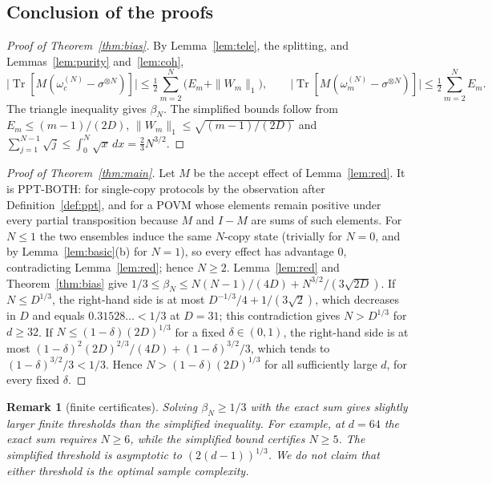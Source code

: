 \documentclass[pdflatex,sn-mathphys-num]{sn-jnl}%
\theoremstyle{thmstyleone}
\theoremstyle{thmstylethree}
\theoremstyle{thmstyletwo}
\newtheorem{remark}[theorem]{Remark}
\newcommand{\Tr}{\operatorname{Tr}}
\begin{document}
\subsection{Conclusion of the proofs}\label{sec:concl}

\begin{proof}[Proof of Theorem~\ref{thm:bias}]
By Lemma~\ref{lem:tele}, the splitting, and Lemmas~\ref{lem:purity} and~\ref{lem:coh},
\[
\bigl|\Tr[M(\omega_c^{(N)}-\sigma^{\otimes N})]\bigr|\le\tfrac12\sum_{m=2}^N\bigl(E_m+\|W_m\|_1\bigr),\qquad
\bigl|\Tr[M(\omega_m^{(N)}-\sigma^{\otimes N})]\bigr|\le\tfrac12\sum_{m=2}^NE_m .
\]
The triangle inequality gives $\beta_N$. The simplified bounds follow from $E_m\le(m-1)/(2D)$,
$\|W_m\|_1\le\sqrt{(m-1)/(2D)}$ and $\sum_{j=1}^{N-1}\sqrt j\le\int_0^N\sqrt x\,dx=\frac23N^{3/2}$.
\end{proof}

\begin{proof}[Proof of Theorem~\ref{thm:main}]
Let $M$ be the accept effect of Lemma~\ref{lem:red}. It is PPT-BOTH: for single-copy protocols by the observation after
Definition~\ref{def:ppt}, and for a POVM whose elements remain positive under every partial transposition because $M$ and $I-M$
are sums of such elements. For $N\le1$ the two ensembles induce the same $N$-copy state (trivially for $N=0$, and by
Lemma~\ref{lem:basic}(b) for $N=1$), so every effect has advantage $0$, contradicting Lemma~\ref{lem:red}; hence
$N\ge2$. Lemma~\ref{lem:red} and Theorem~\ref{thm:bias} give
$1/3\le\beta_N\le N(N-1)/(4D)+N^{3/2}/(3\sqrt{2D})$. If $N\le D^{1/3}$, the right-hand side is at most
$D^{-1/3}/4+1/(3\sqrt2)$, which decreases in $D$ and equals $0.31528\ldots<1/3$ at $D=31$; this contradiction gives
$N>D^{1/3}$ for $d\ge32$. If $N\le(1-\delta)(2D)^{1/3}$ for a fixed $\delta\in(0,1)$, the right-hand side is at most
$(1-\delta)^2(2D)^{2/3}/(4D)+(1-\delta)^{3/2}/3$, which tends to $(1-\delta)^{3/2}/3<1/3$. Hence
$N>(1-\delta)(2D)^{1/3}$ for all sufficiently large $d$, for every fixed $\delta$.
\end{proof}

\begin{remark}[finite certificates]\label{rem:finite}
Solving $\beta_N\ge1/3$ with the exact sum gives slightly larger finite thresholds than the simplified inequality. For
example, at $d=64$ the exact sum requires $N\ge6$, while the simplified bound certifies $N\ge5$. The simplified
threshold is asymptotic to $(2(d-1))^{1/3}$. We do not claim that either threshold is the optimal sample complexity.
\end{remark}
\end{document}
